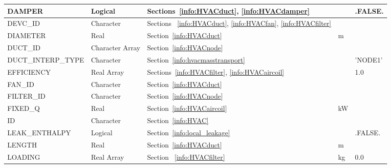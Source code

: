 \documentclass[11pt]{book}
\begin{document}
\begin{longtable}{@{\extracolsep{\fill}}|l|l|l|l|l|}
{\ct DAMPER}                    & Logical           & Sections~\ref{info:HVACduct}, \ref{info:HVACdamper}                           &               & {\ct .FALSE.}  \\ \hline
{\ct DEVC\_ID}                  & Character         & Sections ~\ref{info:HVACduct}, \ref{info:HVACfan}, \ref{info:HVACfilter}      &               &                \\ \hline
{\ct DIAMETER}                  & Real              & Section~\ref{info:HVACduct}                                                   &  m            &                \\ \hline
{\ct DUCT\_ID}                  & Character Array   & Section~\ref{info:HVACnode}                                                   &               &                \\ \hline
{\ct DUCT\_INTERP\_TYPE}        & Character         & Section~\ref{info:hvacmasstransport}                                          &               & {\ct 'NODE1'}  \\ \hline
{\ct EFFICIENCY}                & Real Array        & Sections~\ref{info:HVACfilter}, \ref{info:HVACaircoil}                        &               & 1.0            \\ \hline
{\ct FAN\_ID}                   & Character         & Section~\ref{info:HVACduct}                                                   &               &                \\ \hline
{\ct FILTER\_ID}                & Character         & Section~\ref{info:HVACnode}                                                   &               &                \\ \hline
{\ct FIXED\_Q}                  & Real              & Section~\ref{info:HVACaircoil}                                                & kW            &                \\ \hline
{\ct ID}                        & Character         & Section~\ref{info:HVAC}                                                       &               &                \\ \hline
{\ct LEAK\_ENTHALPY}            & Logical           & Section~\ref{info:local_leakage}                                              &               & {\ct .FALSE.}  \\ \hline
{\ct LENGTH}                    & Real              & Section~\ref{info:HVACduct}                                                   &  m            &                \\ \hline
{\ct LOADING}                   & Real Array        & Section ~\ref{info:HVACfilter}                                                & kg            & 0.0            \\ \hline

\end{longtable}
\end{document}
